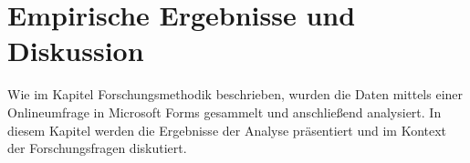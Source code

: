 \section{Empirische Ergebnisse und Diskussion}


Wie im Kapitel Forschungsmethodik beschrieben, wurden die Daten mittels einer Onlineumfrage in Microsoft Forms gesammelt und anschließend analysiert.
In diesem Kapitel werden die Ergebnisse der Analyse präsentiert und im Kontext der Forschungsfragen diskutiert.




